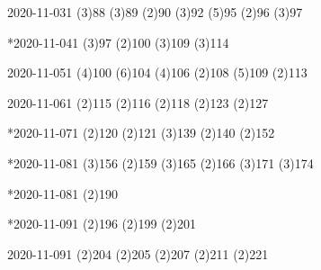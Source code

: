 \documentclass{ctexart}
\begin{document}
\begin{sdpolitics}{2020-11-03}{1}
  \addto[2020-11-06](3){88}
  \addto[2020-11-06](3){89}
  \addto[2020-11-07](2){90}
  \addto[2020-11-06](3){92}
  \addto[2020-11-08](5){95}
  \addto[2020-11-13](2){96}
  \addto[2020-11-06](3){97}
\end{sdpolitics}

\begin{sdpolitics}*{2020-11-04}{1}
  \addto[2020-11-06](3){97}
  \addto[2020-11-08](2){100}
  \addto[2020-11-06](3){109}
  \addto[2020-11-06](3){114}
\end{sdpolitics}

\begin{sdpolitics}{2020-11-05}{1}
  \addto[2020-11-07](4){100}
  \addto[2020-11-13](6){104}
  \addto[2020-11-07](4){106}
  \addto[2020-11-10](2){108}
  \addto[2020-11-10](5){109}
  \addto[2020-11-10](2){113}
\end{sdpolitics}

\begin{sdpolitics}{2020-11-06}{1}
  \addto[2020-11-08](2){115}
  \addto[2020-11-09](2){116}
  \addto[2020-11-09](2){118}
  \addto[2020-11-09](2){123}
  \addto[2020-11-09](2){127}
\end{sdpolitics}

\begin{sdpolitics}*{2020-11-07}{1}
  \addto[2020-11-17](2){120}
  \addto[2020-11-17](2){121}
  \addto[2020-11-20](3){139}
  \addto[2020-11-09](2){140}
  \addto[2020-11-17](2){152}
\end{sdpolitics}

\begin{sdpolitics}*{2020-11-08}{1}
  \addto[2020-11-14](3){156}
  \addto[2020-11-11](2){159}
  \addto[2020-11-14](3){165}
  \addto[2020-11-18](2){166}
  \addto[2020-11-14](3){171}
  \addto[2020-11-14](3){174}
\end{sdpolitics}

\begin{sdpolitics}*{2020-11-08}{1}
  \addto[2020-11-11](2){190}
\end{sdpolitics}

\begin{sdpolitics}*{2020-11-09}{1}
  \addto[2020-11-12](2){196}
  \addto[2020-11-12](2){199}
  \addto[2020-11-12](2){201}
\end{sdpolitics}

\begin{sdpolitics}{2020-11-09}{1}
  \addto[2020-11-20](2){204}
  \addto[2020-11-12](2){205}
  \addto[2020-11-12](2){207}
  \addto[2020-11-20](2){211}
  \addto[2020-11-12](2){221}
\end{sdpolitics}
\end{document}
